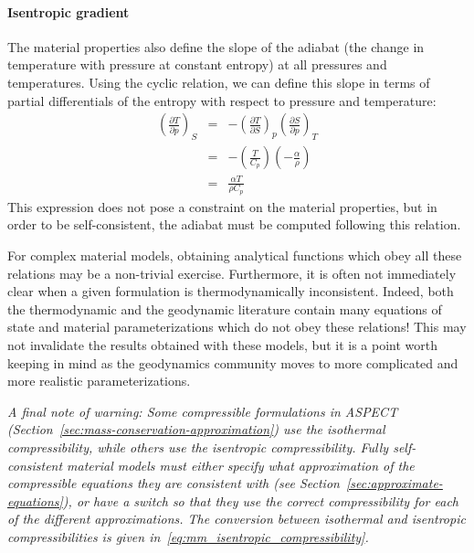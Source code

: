 \documentclass{article}
\newcommand{\aspect}{\textsc{ASPECT}}
\begin{document}
\paragraph{Isentropic gradient}
The material properties also define the slope of the adiabat (the change in temperature with
pressure at constant entropy) at all pressures and temperatures. Using the cyclic relation,
we can define this slope in terms of partial differentials of the entropy with respect to pressure
and temperature:
\begin{eqnarray}
  \left( \frac{\partial T}{\partial p} \right)_{S} &=& - \left( \frac{\partial T}{\partial S} \right)_{p} \left( \frac{\partial S}{\partial p} \right)_{T} \\
  &=& - \left( \frac{T}{C_p} \right) \left( - \frac{\alpha}{\rho} \right) \\
  &=& \frac{\alpha T}{\rho C_p} \label{eq:mm_isentropic_gradient}
\end{eqnarray}
This expression does not pose a constraint on the material properties, but in order to be
self-consistent, the adiabat must be computed following this relation.

For complex material models, obtaining analytical functions which obey all these relations
may be a non-trivial exercise. Furthermore, it is often not immediately clear when a
given formulation is thermodynamically inconsistent. Indeed, both the
thermodynamic and the geodynamic literature contain many equations of
state and material parameterizations which do not obey these
relations! This may not invalidate the results obtained with these
models, but it is a point worth keeping in mind as the geodynamics
community moves to more complicated and more realistic parameterizations.

\emph{A final note of warning: Some compressible formulations in \aspect{}
  (Section~\ref{sec:mass-conservation-approximation}) use the isothermal compressibility,
  while others use the isentropic compressibility. Fully self-consistent material models must
  either specify what approximation of the compressible equations they are consistent with
  (see Section~\ref{sec:approximate-equations}), or have a switch so that they use the correct
  compressibility for each of the different approximations. The conversion between isothermal
  and isentropic compressibilities is given in~\eqref{eq:mm_isentropic_compressibility}.}
\end{document}
